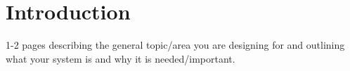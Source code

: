 \documentclass[requirements.tex]{subfiles}
\begin{document}
\section{Introduction} %
\label{sec:introduction}

1-2 pages describing the general topic/area you are designing for and outlining
what your system is and why it is needed/important.

\newpage
\end{document}
